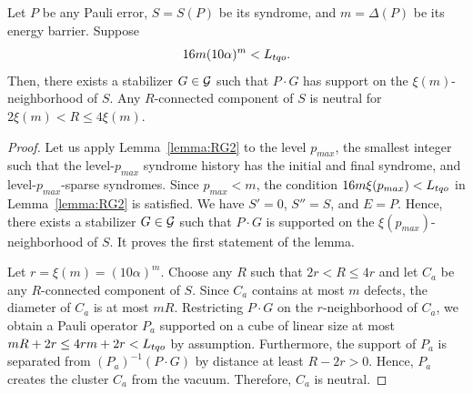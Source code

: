 \begin{lem}
\label{lemma:neutral-components}
Let $P$ be any Pauli error,
$S=S(P)$ be its syndrome,
and $m=\Delta(P)$ be its energy barrier.
Suppose
\begin{equation}
\label{msmall}
16m(10\alpha)^m < {L_{tqo}}.
\end{equation}
Then, there exists a stabilizer $G \in {\cal G}$ such that $P \cdot G$
has support on the $\xi(m)$-neighborhood of $S$.
Any $R$-connected component of $S$ is neutral for $2\xi(m) < R \le 4 \xi(m)$.
\end{lem}
\begin{proof}
Let us apply Lemma~\ref{lemma:RG2} to the level $p_{max}$,
the smallest integer such that
the level-$p_{max}$ syndrome history has the initial and final syndrome,
and level-$p_{max}$-sparse syndromes.
Since $p_{max} < m$, the condition $16 m \xi(p_{max}) < {L_{tqo}}$ 
in Lemma~\ref{lemma:RG2} is satisfied.
We have $S'=0$, $S''=S$, and $E=P$.
Hence, there exists a stabilizer $G \in {\cal G}$ such that
$P\cdot G$ is supported on the $\xi(p_{max})$-neighborhood of $S$.
It proves the first statement of the lemma.

Let $r = \xi(m) = (10\alpha)^m$.
Choose any $R$ such that $2r < R \le 4r$
and let $C_a$ be any $R$-connected component of $S$.
Since $C_a$ contains at most $m$ defects, the diameter of $C_a$ is at most $mR$.
Restricting $P \cdot G$ on the $r$-neighborhood of $C_a$,
we obtain a Pauli operator $P_a$
supported on a cube of linear size at most $mR+2r \le 4rm+2r <{L_{tqo}}$ by assumption.
Furthermore, the support of $P_a$ is separated from $(P_a)^{-1} (P \cdot G)$
by distance at least $R - 2r > 0$.
Hence, $P_a$ creates the cluster $C_a$ from the vacuum.
Therefore, $C_a$ is neutral.
\end{proof}

